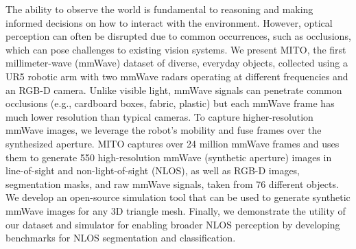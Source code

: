 The ability to observe the world is fundamental to reasoning and making informed decisions on how to interact with the environment. However, optical perception can often be disrupted due to common occurrences, such as occlusions, which can pose challenges to existing vision systems. We present MITO, the first millimeter-wave (mmWave) dataset of diverse, everyday objects, collected using a UR5 robotic arm with two mmWave radars operating at different frequencies and an RGB-D camera. Unlike visible light, mmWave signals can penetrate common occlusions (e.g., cardboard boxes, fabric, plastic) but each mmWave frame has much lower resolution than typical cameras. To capture higher-resolution mmWave images, we leverage the robot's mobility and fuse frames over the synthesized aperture. MITO captures over 24 million mmWave frames and uses them to generate 550 high-resolution mmWave (synthetic aperture) images in line-of-sight and non-light-of-sight (NLOS), as well as RGB-D images, segmentation masks, and raw mmWave signals, taken from 76 different objects. We develop an open-source simulation tool that can be used to generate synthetic mmWave images for any 3D triangle mesh. Finally, we demonstrate the utility of our dataset and simulator for enabling broader NLOS perception by developing benchmarks for NLOS segmentation and classification.
